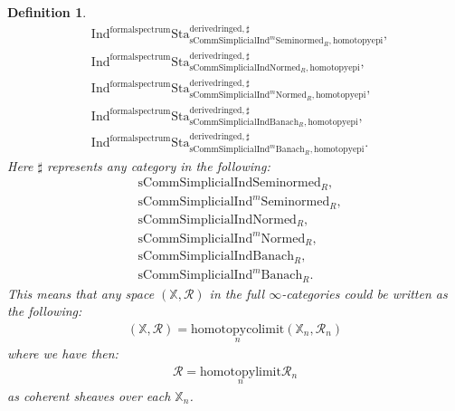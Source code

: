 \documentclass[12pt]{book}
\newtheorem{definition}{Definition}
\begin{document}
\begin{definition}
\begin{align}
&\mathrm{Ind}^\mathrm{formalspectrum}\mathrm{Sta}^\mathrm{derivedringed,\sharp}_{\mathrm{sComm}\mathrm{Simplicial}\mathrm{Ind}^m\mathrm{Seminormed}_R,\mathrm{homotopyepi}},\\
&\mathrm{Ind}^\mathrm{formalspectrum}\mathrm{Sta}^\mathrm{derivedringed,\sharp}_{\mathrm{sComm}\mathrm{Simplicial}\mathrm{Ind}\mathrm{Normed}_R,\mathrm{homotopyepi}},\\
&\mathrm{Ind}^\mathrm{formalspectrum}\mathrm{Sta}^\mathrm{derivedringed,\sharp}_{\mathrm{sComm}\mathrm{Simplicial}\mathrm{Ind}^m\mathrm{Normed}_R,\mathrm{homotopyepi}},\\
&\mathrm{Ind}^\mathrm{formalspectrum}\mathrm{Sta}^\mathrm{derivedringed,\sharp}_{\mathrm{sComm}\mathrm{Simplicial}\mathrm{Ind}\mathrm{Banach}_R,\mathrm{homotopyepi}},\\
&\mathrm{Ind}^\mathrm{formalspectrum}\mathrm{Sta}^\mathrm{derivedringed,\sharp}_{\mathrm{sComm}\mathrm{Simplicial}\mathrm{Ind}^m\mathrm{Banach}_R,\mathrm{homotopyepi}}.	
\end{align}
Here $\sharp$ represents any category in the following:
\begin{align}
&\mathrm{sComm}\mathrm{Simplicial}\mathrm{Ind}\mathrm{Seminormed}_R,\\
&\mathrm{sComm}\mathrm{Simplicial}\mathrm{Ind}^m\mathrm{Seminormed}_R,\\
&\mathrm{sComm}\mathrm{Simplicial}\mathrm{Ind}\mathrm{Normed}_R,\\
&\mathrm{sComm}\mathrm{Simplicial}\mathrm{Ind}^m\mathrm{Normed}_R,\\
&\mathrm{sComm}\mathrm{Simplicial}\mathrm{Ind}\mathrm{Banach}_R,\\
&\mathrm{sComm}\mathrm{Simplicial}\mathrm{Ind}^m\mathrm{Banach}_R.	
\end{align}	
This means that any space $(\mathbb{X},\mathcal{R})$ in the full $\infty$-categories could be written as the following:
\begin{align}
(\mathbb{X},\mathcal{R})=\underset{n}{\mathrm{homotopycolimit}}(\mathbb{X}_n,\mathcal{R}_n)	
\end{align}
where we have then:
\begin{align}
\mathcal{R}=\underset{n}{\mathrm{homotopylimit}}\mathcal{R}_n	
\end{align}
as coherent sheaves over each $\mathbb{X}_n$.

	
\end{definition}
\end{document}
